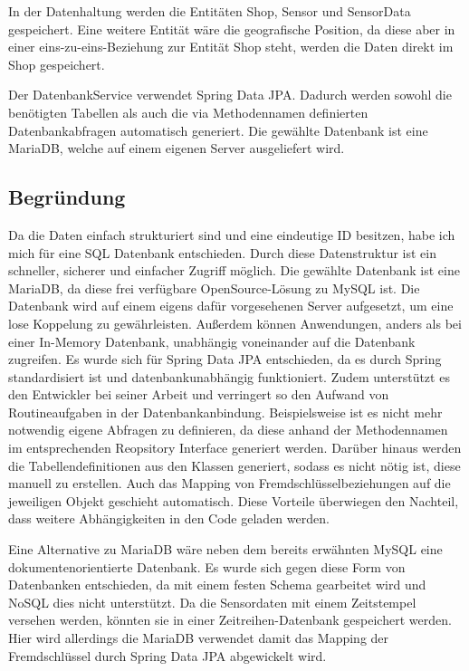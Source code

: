 \documentclass[runningheads]{llncs}
\begin{document}
In der Datenhaltung werden die Entitäten Shop, Sensor und SensorData gespeichert.
Eine weitere Entität wäre die geografische Position, da diese aber in einer eins-zu-eins-Beziehung zur Entität Shop steht, werden die Daten direkt im Shop gespeichert.

Der DatenbankService verwendet Spring Data JPA.
Dadurch werden sowohl die benötigten Tabellen als auch die via Methodennamen definierten Datenbankabfragen automatisch generiert.
Die gewählte Datenbank ist eine MariaDB, welche auf einem eigenen Server ausgeliefert wird.


\subsection{Begründung}
Da die Daten einfach strukturiert sind und eine eindeutige ID besitzen, habe ich mich für eine SQL Datenbank entschieden.
Durch diese Datenstruktur ist ein schneller, sicherer und einfacher Zugriff möglich.
Die gewählte Datenbank ist eine MariaDB, da diese frei verfügbare OpenSource-Lösung zu MySQL ist.
Die Datenbank wird auf einem eigens dafür vorgesehenen Server aufgesetzt, um eine lose Koppelung zu gewährleisten. 
Außerdem können Anwendungen, anders als bei einer In-Memory Datenbank, unabhängig voneinander auf die Datenbank zugreifen.
Es wurde sich für Spring Data JPA entschieden, da es durch Spring standardisiert ist und datenbankunabhängig funktioniert.
Zudem unterstützt es den Entwickler bei seiner Arbeit  und verringert so den Aufwand von Routineaufgaben in der Datenbankanbindung.
Beispielsweise ist es nicht mehr notwendig eigene Abfragen zu definieren, da diese anhand der Methodennamen im entsprechenden Reopsitory Interface generiert werden.
Darüber hinaus werden die Tabellendefinitionen aus den Klassen generiert, sodass es nicht nötig ist, diese manuell zu erstellen.
Auch das Mapping von Fremdschlüsselbeziehungen auf die jeweiligen Objekt geschieht automatisch.
Diese Vorteile überwiegen den Nachteil, dass weitere Abhängigkeiten in den Code geladen werden.

Eine Alternative zu MariaDB wäre neben dem bereits erwähnten MySQL eine dokumentenorientierte Datenbank.
Es wurde sich gegen diese Form von Datenbanken entschieden, da mit einem festen Schema gearbeitet wird und NoSQL dies nicht unterstützt.
Da die Sensordaten mit einem Zeitstempel versehen werden, könnten sie in einer Zeitreihen-Datenbank gespeichert werden.
Hier wird allerdings die MariaDB verwendet damit das Mapping der Fremdschlüssel durch Spring Data JPA abgewickelt wird.
\end{document}

